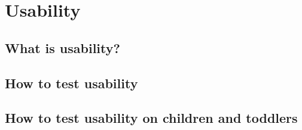 \chapter{Usability}
\label{Usability}

\section{What is usability?}

\section{How to test usability}

\section{How to test usability on children and toddlers}